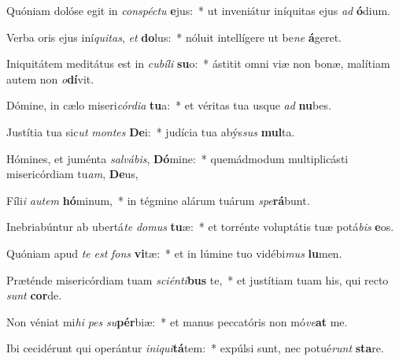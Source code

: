 \item Quóniam dolóse egit in \textit{con}\textit{spéc}\textit{tu} \textbf{e}jus:~* ut inveniátur iníquitas ejus \textit{ad} \textbf{ó}dium.
\item Verba oris ejus iní\textit{qui}\textit{tas}, \textit{et} \textbf{do}lus:~* nóluit intellígere ut be\textit{ne} \textbf{á}geret.
\item Iniquitátem meditátus est in \textit{cu}\textit{bí}\textit{li} \textbf{su}o:~* ástitit omni viæ non bonæ, malítiam autem non \textit{o}\textbf{dí}vit.
\item Dómine, in cælo miseri\textit{cór}\textit{di}\textit{a} \textbf{tu}a:~* et véritas tua usque \textit{ad} \textbf{nu}bes.
\item Justítia tua sic\textit{ut} \textit{mon}\textit{tes} \textbf{De}i:~* judícia tua abýs\textit{sus} \textbf{mul}ta.
\item Hómines, et juménta \textit{sal}\textit{vá}\textit{bis}, \textbf{Dó}mine:~* quemádmodum multiplicásti misericórdiam tu\textit{am}, \textbf{De}us,
\item Fíli\textit{i} \textit{au}\textit{tem} \textbf{hó}minum,~* in tégmine alárum tuárum \textit{spe}\textbf{rá}bunt.
\item Inebriabúntur ab ubertá\textit{te} \textit{do}\textit{mus} \textbf{tu}æ:~* et torrénte voluptátis tuæ potá\textit{bis} \textbf{e}os.
\item Quóniam apud \textit{te} \textit{est} \textit{fons} \textbf{vi}tæ:~* et in lúmine tuo vidébi\textit{mus} \textbf{lu}men.
\item Præténde misericórdiam tuam \textit{sci}\textit{én}\textit{ti}\textbf{bus} te,~* et justítiam tuam his, qui recto \textit{sunt} \textbf{cor}de.
\item Non véniat mi\textit{hi} \textit{pes} \textit{su}\textbf{pér}biæ:~* et manus peccatóris non mó\textit{ve}\textbf{at} me.
\item Ibi cecidérunt qui operántur \textit{in}\textit{i}\textit{qui}\textbf{tá}tem:~* expúlsi sunt, nec potué\textit{runt} \textbf{sta}re.
